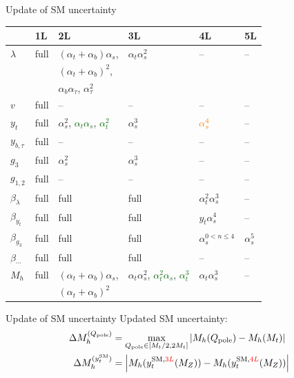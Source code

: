 \documentclass[hyperref={pdfpagelabels=false},ngerman]{beamer}
\newcommand{\SM}{\ensuremath{\text{SM}}}
\newcommand{\at}{\alpha_t}
\newcommand{\ab}{\alpha_b}
\newcommand{\atau}{\alpha_\tau}
\newcommand{\as}{\alpha_s}
\newcommand{\Qpole}{\ensuremath{Q_\text{pole}}}
\newcommand{\DMhQpole}{\ensuremath{\Delta M_h^{(\Qpole)}}}
\newcommand{\DMhHSSUSYytSM}{\ensuremath{\Delta M_h^{(y_t^\SM)}}}
\begin{document}
\begin{frame}{Update of SM uncertainty}
  \centering
  \begin{tabular}{llllll}
    \toprule
               & 1L & 2L & 3L & 4L & 5L\\
    \midrule
    $\lambda$  & full & $(\at+\ab)\as$, & $\at\as^2$ & -- & -- \\
               &      & $(\at+\ab)^2$, \\
               &      & $\ab\atau$, $\atau^2$ \\
    $v$        & full & -- & -- & -- & -- \\
    $y_t$      & full & $\as^2$, \textcolor{darkgreen}{$\at\as$}, \textcolor{darkgreen}{$\at^2$} & $\as^3$ & $\textcolor{orange}{\as^4}$ & -- \\
    $y_{b,\tau}$ & full & -- & -- & -- & -- \\
    $g_3$      & full & $\as^2$ &  $\as^3$ & -- & -- \\
    $g_{1,2}$   & full & -- & -- & -- & -- \\
    \midrule
    $\beta_{\lambda}$ & full & full & full & $\at^2\as^3$ & -- \\
    $\beta_{y_t}$    & full & full & full & $y_t\as^4$ & -- \\
    $\beta_{g_3}$    & full & full & full & $\as^{0<n\le 4}$ & $\as^5$ \\
    $\beta_{\cdots}$  & full & full & full & -- & -- \\
    \midrule
    $M_h$           & full & $(\at+\ab)\as$, & $\at\as^2$, \textcolor{darkgreen}{$\at^2\as$}, \textcolor{darkgreen}{$\at^3$} & $\at\as^3$ & -- \\
                    &      & $(\at + \ab)^2$ \\
    \bottomrule
  \end{tabular}
\end{frame}

\begin{frame}{Update of SM uncertainty}
  Updated SM uncertainty:
  \begin{align*}
    \DMhQpole &= \max_{\Qpole\in[M_t/2,2M_t]}\left|M_h(\Qpole) - M_h(M_t)\right| \\
    \DMhHSSUSYytSM &= \left| M_h(y_t^{\SM,\textcolor{red}{3L}}(M_Z)) - M_h(y_t^{\SM,\textcolor{red}{4L}}(M_Z)) \right|
  \end{align*}
\end{frame}
\end{document}
